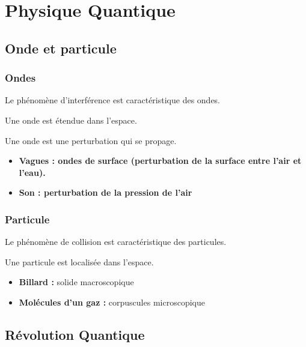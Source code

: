 \chapter{Physique Quantique}

\section{Onde et particule}
\subsection{Ondes}
Le phénomène d'interférence est caractéristique des ondes.
\begin{center}
Une onde est étendue dans l'espace.
\end{center}
\begin{center}
Une onde est une perturbation qui se propage.
\end{center}

\begin{itemize}[leftmargin=1cm, label=, itemsep=1pt]
\item {\bf Vagues : ondes de surface (perturbation de la surface entre l'air et l'eau).}
\item {\bf Son : perturbation de la pression de l'air}
\end{itemize}

\subsection{Particule}
Le phénomène de collision est caractéristique des particules.
\begin{center}
Une particule est localisée dans l'espace.
\end{center}
\begin{itemize}[leftmargin=1cm, label=, itemsep=1pt]
\item {\bf Billard :} solide macroscopique
\item {\bf Molécules d'un gaz :} corpuscules microscopique
\end{itemize}

\section{Révolution Quantique}

